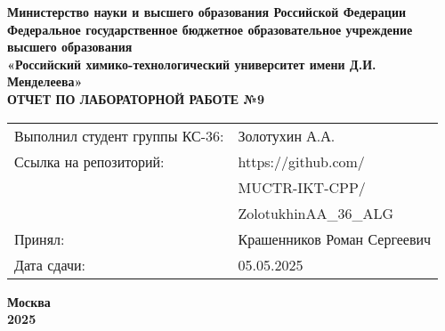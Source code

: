 \documentclass[12pt, a4paper]{report}
\begin{document}
	\begin{titlepage}
		\begin{center}
			\large \textbf{Министерство науки и высшего образования Российской Федерации} \\
			\large \textbf{Федеральное государственное бюджетное образовательное учреждение высшего образования} \\
			\large \textbf{«Российский химико-технологический университет имени Д.И. Менделеева»} \\

			\vspace*{4cm}
			\LARGE \textbf{ОТЧЕТ ПО ЛАБОРАТОРНОЙ РАБОТЕ №9}

			\vspace*{4cm}
			\begin{flushright}
				\Large
				\begin{tabular}{>{\raggedleft\arraybackslash}p{9cm} p{10cm}}
					Выполнил студент группы КС-36: & Золотухин А.А. \\
					Ссылка на репозиторий: & https://github.com/ \\
					& MUCTR-IKT-CPP/ \\
					& ZolotukhinAA\_36\_ALG \\
					Принял: & Крашенников Роман Сергеевич \\
					Дата сдачи: & 05.05.2025 \\
				\end{tabular}
			\end{flushright}

			\vspace*{6cm}
			\Large \textbf{Москва \\ 2025}
		\end{center}
	\end{titlepage}

	\tableofcontents
	\thispagestyle{empty}
	\newpage

\end{document}
